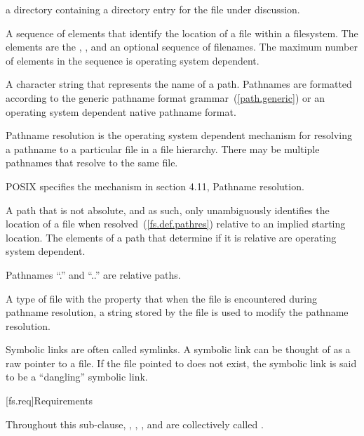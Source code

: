  a directory containing a directory
entry for the file under discussion.

A sequence of elements that identify
the location of a file within a filesystem.
The elements are the
,
,
and an optional sequence of filenames.
The maximum number of elements in the sequence is operating system dependent.

A character string that represents the name of a path. Pathnames are
formatted according to the generic pathname format grammar~(\ref{path.generic}) or an
operating system dependent
native pathname format.

Pathname resolution is the operating system dependent mechanism for resolving
a pathname to a particular file in a file hierarchy. There may be multiple
pathnames that resolve to the same file.
\begin{example} POSIX specifies the mechanism in section 4.11, Pathname resolution.
\end{example}

A path that is not absolute, and as such, only unambiguously
identifies the location of a file when resolved~(\ref{fs.def.pathres}) relative to
an implied starting location. The elements of a path that determine if it is
relative are operating system dependent.
\begin{note}
Pathnames ``.'' and ``..'' are relative paths.
\end{note}

A type of file with the
property that when the file is encountered during pathname resolution, a string
stored by the file is used to modify the pathname resolution.
\begin{note} Symbolic links are often called symlinks. A symbolic link can be thought of as a raw pointer to a file.
If the file pointed to does not exist, the symbolic link is said to be a
``dangling'' symbolic link.\end{note}

[fs.req]{Requirements}

\pnum
Throughout this sub-clause, , ,
, and  are collectively called
.

